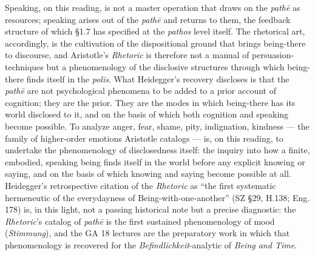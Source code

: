 \documentclass{article}
\begin{document}
Speaking, on this reading, is not a master operation that draws on the \textit{pathē} as resources; speaking arises out of the \textit{pathē} and returns to them, the feedback structure of which \S1.7 has specified at the \textit{pathos} level itself. The rhetorical art, accordingly, is the cultivation of the dispositional ground that brings being-there to discourse, and Aristotle's \textit{Rhetoric} is therefore not a manual of persuasion-techniques but a phenomenology of the disclosive structures through which being-there finds itself in the \textit{polis}. What Heidegger's recovery discloses is that the \textit{pathē} are not psychological phenomena to be added to a prior account of cognition; they are the prior. They are the modes in which being-there has its world disclosed to it, and on the basis of which both cognition and speaking become possible. To analyze anger, fear, shame, pity, indignation, kindness --- the family of higher-order emotions Aristotle catalogs --- is, on this reading, to undertake the phenomenology of disclosedness itself: the inquiry into how a finite, embodied, speaking being finds itself in the world before any explicit knowing or saying, and on the basis of which knowing and saying become possible at all. Heidegger's retrospective citation of the \textit{Rhetoric} as ``the first systematic hermeneutic of the everydayness of Being-with-one-another'' (SZ \S29, H.138; Eng. 178) is, in this light, not a passing historical note but a precise diagnostic: the \textit{Rhetoric}'s catalog of \textit{pathē} is the first sustained phenomenology of mood (\textit{Stimmung}), and the GA 18 lectures are the preparatory work in which that phenomenology is recovered for the \textit{Befindlichkeit}-analytic of \textit{Being and Time}.
\end{document}
